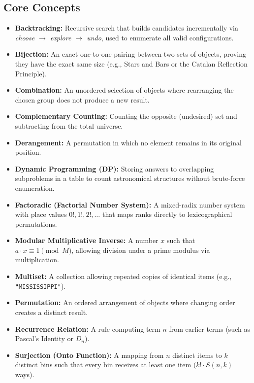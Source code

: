 \documentclass[11pt,a4paper]{article}
\theoremstyle{definition}
\begin{document}
\subsection*{Core Concepts}
\begin{itemize}
    \item \textbf{Backtracking:} Recursive search that builds candidates incrementally via \emph{choose $\to$ explore $\to$ undo}, used to enumerate all valid configurations.
    \item \textbf{Bijection:} An exact one-to-one pairing between two sets of objects, proving they have the exact same size (e.g., Stars and Bars or the Catalan Reflection Principle).
    \item \textbf{Combination:} An unordered selection of objects where rearranging the chosen group does not produce a new result.
    \item \textbf{Complementary Counting:} Counting the opposite (undesired) set and subtracting from the total universe.
    \item \textbf{Derangement:} A permutation in which no element remains in its original position.
    \item \textbf{Dynamic Programming (DP):} Storing answers to overlapping subproblems in a table to count astronomical structures without brute-force enumeration.
    \item \textbf{Factoradic (Factorial Number System):} A mixed-radix number system with place values $0!, 1!, 2!, \dots$ that maps ranks directly to lexicographical permutations.
    \item \textbf{Modular Multiplicative Inverse:} A number $x$ such that $a \cdot x \equiv 1 \pmod M$, allowing division under a prime modulus via multiplication.
    \item \textbf{Multiset:} A collection allowing repeated copies of identical items (e.g., \texttt{"MISSISSIPPI"}).
    \item \textbf{Permutation:} An ordered arrangement of objects where changing order creates a distinct result.
    \item \textbf{Recurrence Relation:} A rule computing term $n$ from earlier terms (such as Pascal's Identity or $D_n$).
    \item \textbf{Surjection (Onto Function):} A mapping from $n$ distinct items to $k$ distinct bins such that every bin receives at least one item ($k! \cdot S(n, k)$ ways).
\end{itemize}
\end{document}
